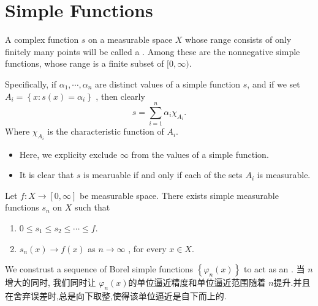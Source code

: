 \documentclass[../main.tex]{subfiles}
\begin{document}
\section{Simple Functions}

\begin{definition}{}{}
    A complex function \(  s  \) on a measurable space \(  X  \) whose range consists of only finitely many points will be called a . Among these are the nonnegative simple functions, whose range is a finite subset of \(  [0,\infty)  \).    

   Specifically, if \(   \alpha_1,\cdots,\alpha_n   \) are distinct values of a simple function \(  s  \), and if we set \(  A_{i}= \left\{ x:s\left( x \right)= \alpha _{i}  \right\}  \) , then clearly \[
    s= \sum _{i= 1}^{n}\alpha _{i}\chi _{A_{i}}.
    \]Where \(  \chi _{A_{i}}  \) is the characteristic function of \(  A_{i}  \).      
\end{definition}
\begin{remark}
  \begin{itemize}
    \item   Here, we explicity exclude \(  \infty  \) from the values of a simple function. 
    \item It is clear that \(  s  \) is mearuable if and only if each of the sets \(  A_{i}  \) is measurable.  
  \end{itemize}
  
\end{remark}

\begin{theorem}{}{}
    Let \(  f: X\to [0,\infty]  \) be measurable space. There exists simple measurable functions \(  s_{n}  \) on \(  X  \) such that 
    \begin{enumerate}
        \item \(  0\le s_1\le s_2\le \cdots \le f  \). 
        \item \(  s_{n}\left( x \right)\to f\left( x \right)    \) as \(  n\to \infty  \) , for every \(  x \in X  \).     
    \end{enumerate}
       
\end{theorem}

\begin{proofsketch}
    We construst a sequence of Borel  simple functions \( \left\{  \varphi _{n}\left( x \right) \right\}    \) to act as an . 当 \(  n  \) 增大的同时, 我们同时让 \(   \varphi _{n}\left( x \right)   \)的单位逼近精度和单位逼近范围随着 \(  n  \)提升.并且在舍弃误差时,总是向下取整,使得该单位逼近是自下而上的.   
\end{proofsketch}
\end{document}
